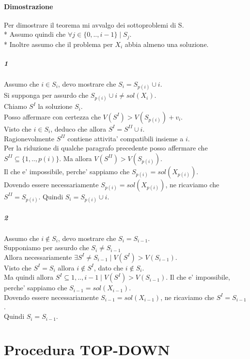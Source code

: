 \paragraph{Dimostrazione}

Per dimostrare il teorema mi avvalgo dei sottoproblemi di S. \\*
Assumo quindi che $\forall j \in \{0,..,i-1\} \mid S_j$. \\*
Inoltre assumo che il problema per $X_i$ abbia almeno una soluzione.

\subparagraph{1}

Assumo che $i \in S_i$, devo mostrare che $S_i = S_{p(i)} \cup {i}$. \\
Si supponga per assurdo che $S_{p(i)} \cup {i} \ne sol(X_i)$. \\
Chiamo $S^I$ la soluzione ${S_i}$. \\
Posso affermare con certezza che $V(S^I) > V(S_{p(i)}) + v_i$. \\
Visto che $i \in S_i$, deduco che allora $S^I = S^{II} \cup {i}$. \\
Ragionevolmente $S^{II}$ contiene attivita' compatibili insieme a $i$. \\
Per la riduzione di qualche paragrafo precedente posso affermare che $S^{II} \subseteq \{1,..,p(i)\}$.
Ma allora $V(S^{II}) > V(S_{p(i)})$. \\
Il che e' impossibile, perche' sappiamo che $S_{p(i)} = sol(X_{p(i)})$. \\
Dovendo essere necessariamente $S_{p(i)} = sol(X_{p(i)})$, ne ricaviamo che $S^{II} = S_{p(i)}$.
Quindi $S_i = S_{p(i)} \cup {i}$.

\subparagraph{2}

Assumo che $i \notin S_i$, devo mostrare che $S_i = S_{i-1}$. \\
Supponiamo per assurdo che $S_i \ne S_{i-1}$ \\
Allora necessariamente $\exists S^I \ne S_{i-1} \mid V(S^I) > V(S_{i-1})$. \\
Visto che $S^I = S_i$ allora $i \notin S^I$, dato che $i \notin S_i$. \\
Ma quindi allora $S^I \subseteq {1,..,i-1} \mid V(S^I) > V(S_{i-1})$.
Il che e' impossibile, perche' sappiamo che $S_{i-1} = sol(X_{i-1})$. \\
Dovendo essere necessariamente $S_{i-1} = sol(X_{i-1})$, ne ricaviamo che $S^{I} = S_{i-1}$. \\
Quindi $S_i = S_{i-1}$.

\section{Procedura TOP-DOWN}

